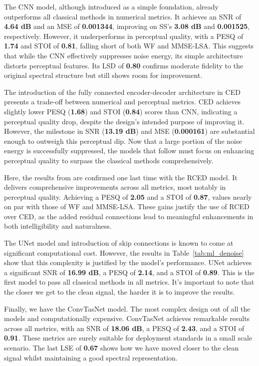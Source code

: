 The CNN model, although introduced as a simple foundation, already outperforms all classical methods in numerical metrics. It achieves an SNR of \textbf{4.64 dB} and an MSE of \textbf{0.001344}, improving on SS’s \textbf{3.08 dB} and \textbf{0.001525}, respectively. However, it underperforms in perceptual quality, with a PESQ of \textbf{1.74} and STOI of \textbf{0.81}, falling short of both WF and MMSE-LSA. This suggests that while the CNN effectively suppresses noise energy, its simple architecture distorts perceptual features. Its LSD of \textbf{0.80} confirms moderate fidelity to the original spectral structure but still shows room for improvement.

The introduction of the fully connected encoder-decoder architecture in CED presents a trade-off between numerical and perceptual metrics. CED achieves slightly lower PESQ (\textbf{1.68}) and STOI (\textbf{0.84}) scores than CNN, indicating a perceptual quality drop, despite the design's intended purpose of improving it. However, the milestone in SNR (\textbf{13.19 dB}) and MSE (\textbf{0.000161}) are substantial enough to outweigh this perceptual dip. Now that a large portion of the noise energy is successfully suppressed, the models that follow must focus on enhancing perceptual quality to surpass the classical methods comprehensively.

Here, the results from \cite{park2017acoustic} are confirmed one last time with the RCED model. It delivers comprehensive improvements across all metrics, most notably in perceptual quality. Achieving a PESQ of \textbf{2.05} and a STOI of \textbf{0.87}, values nearly on par with those of WF and MMSE-LSA. These gains justify the use of RCED over CED, as the added residual connections lead to meaningful enhancements in both intelligibility and naturalness.

The UNet model and introduction of skip connections is known to come at significant computational cost. However, the results in Table~\ref{tab:ml_denoise} show that this complexity is justified by the model's performance. UNet achieves a significant SNR of \textbf{16.99 dB}, a PESQ of \textbf{2.14}, and a STOI of \textbf{0.89}. This is the first model to pass all classical methods in all metrics. It’s important to note that the closer we get to the clean signal, the harder it is to improve the results.

Finally, we have the ConvTasNet model. The most complex design out of all the models and computationally expensive. ConvTasNet achieves remarkable results across all metrics, with an SNR of \textbf{18.06 dB}, a PESQ of \textbf{2.43}, and a STOI of \textbf{0.91}. These metrics are surely suitable for deployment standards in a small scale scenario. The last LSE of \textbf{0.67} shows how we have moved closer to the clean signal whilst maintaining a good spectral representation.

